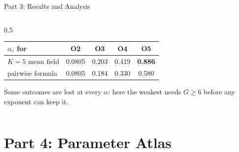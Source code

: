 \documentclass[aspectratio=169,10pt]{beamer}
\newcommand{\hit}[1]{\textcolor{mOrange}{\textbf{#1}}}
\begin{document}
\begin{frame}{Part 3: Results and Analysis}
\begin{columns}[T,onlytextwidth]
\begin{column}{0.5\textwidth}
\centering
{\scriptsize
\begin{tabular}{@{}lcccc@{}}
\toprule
$\alpha_c$ for & O2 & O3 & O4 & O5 \\
\midrule
$K=5$ mean field & 0.0805 & 0.203 & 0.419 & \hit{0.886} \\
pairwise formula & 0.0805 & 0.184 & 0.330 & 0.580 \\
\bottomrule
\end{tabular}}

\raggedright
\smallskip
Some outcomes are lost at \alert{every} $\alpha$: here the weakest needs
$G\ge6$ before any exponent can keep it.
\end{column}
\end{columns}
\end{frame}

\section{Part 4: Parameter Atlas}
\end{document}
